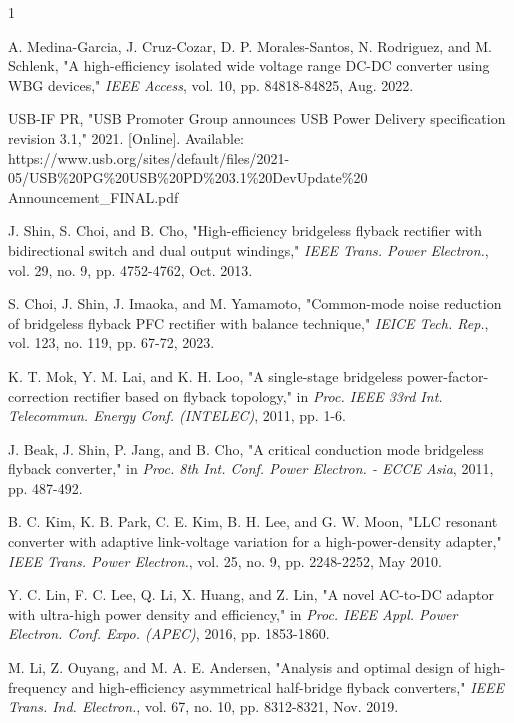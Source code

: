 \documentclass[lettersize,journal]{IEEEtran}
\begin{document}






\begin{thebibliography}{1}


A. Medina-Garcia, J. Cruz-Cozar, D. P. Morales-Santos, N. Rodriguez, and M. Schlenk, "A high-efficiency isolated wide voltage range DC-DC converter using WBG devices," \textit{IEEE Access}, vol. 10, pp. 84818-84825, Aug. 2022.

USB-IF PR, "USB Promoter Group announces USB Power Delivery specification revision 3.1," 2021. [Online]. Available: https://www.usb.org/sites/default/files/2021-05/USB\%20PG\%20USB\%20PD\%203.1\%20DevUpdate\%20\\Announcement\_FINAL.pdf

J. Shin, S. Choi, and B. Cho, "High-efficiency bridgeless flyback rectifier with bidirectional switch and dual output windings," \textit{IEEE Trans. Power Electron.}, vol. 29, no. 9, pp. 4752-4762, Oct. 2013.

S. Choi, J. Shin, J. Imaoka, and M. Yamamoto, "Common-mode noise reduction of bridgeless flyback PFC rectifier with balance technique," \textit{IEICE Tech. Rep.}, vol. 123, no. 119, pp. 67-72, 2023.

K. T. Mok, Y. M. Lai, and K. H. Loo, "A single-stage bridgeless power-factor-correction rectifier based on flyback topology," in \textit{Proc. IEEE 33rd Int. Telecommun. Energy Conf. (INTELEC)}, 2011, pp. 1-6.

J. Beak, J. Shin, P. Jang, and B. Cho, "A critical conduction mode bridgeless flyback converter," in \textit{Proc. 8th Int. Conf. Power Electron. - ECCE Asia}, 2011, pp. 487-492.

B. C. Kim, K. B. Park, C. E. Kim, B. H. Lee, and G. W. Moon, "LLC resonant converter with adaptive link-voltage variation for a high-power-density adapter," \textit{IEEE Trans. Power Electron.}, vol. 25, no. 9, pp. 2248-2252, May 2010.

Y. C. Lin, F. C. Lee, Q. Li, X. Huang, and Z. Lin, "A novel AC-to-DC adaptor with ultra-high power density and efficiency," in \textit{Proc. IEEE Appl. Power Electron. Conf. Expo. (APEC)}, 2016, pp. 1853-1860.

M. Li, Z. Ouyang, and M. A. E. Andersen, "Analysis and optimal design of high-frequency and high-efficiency asymmetrical half-bridge flyback converters," \textit{IEEE Trans. Ind. Electron.}, vol. 67, no. 10, pp. 8312-8321, Nov. 2019.


\end{thebibliography}
\end{document}
